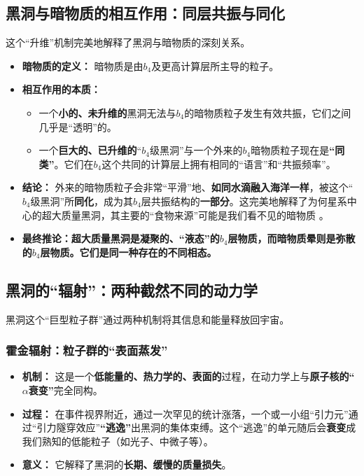 \documentclass[11pt, a4paper]{article}
\begin{document}
\subsection{黑洞与暗物质的相互作用：同层共振与同化}

这个“升维”机制完美地解释了黑洞与暗物质的深刻关系。

\begin{itemize}
    \item \textbf{暗物质的定义：} 暗物质是由$b_4$及更高计算层所主导的粒子。
    \item \textbf{相互作用的本质：}
    \begin{itemize}
        \item 一个\textbf{小的、未升维的}黑洞无法与$b_4$的暗物质粒子发生有效共振，它们之间几乎是“透明”的。
        \item 一个\textbf{巨大的、已升维的}“$b_4$级黑洞”与一个外来的$b_4$暗物质粒子现在是\textbf{“同类”}。它们在$b_4$这个共同的计算层上拥有相同的“语言”和“共振频率”。
    \end{itemize}
    \item \textbf{结论：} 外来的暗物质粒子会非常“平滑”地、\textbf{如同水滴融入海洋一样}，被这个“$b_4$级黑洞”所\textbf{同化}，成为其$b_4$层共振结构的\textbf{一部分}。这完美地解释了为何星系中心的超大质量黑洞，其主要的“食物来源”可能是我们看不见的暗物质 \cite{Planck2020}。
    \item \textbf{最终推论：超大质量黑洞是凝聚的、“液态”的$b_4$层物质，而暗物质晕则是弥散的$b_4$层物质。它们是同一种存在的不同相态。}
\end{itemize}

\subsection{黑洞的“辐射”：两种截然不同的动力学}

黑洞这个“巨型粒子群”通过两种机制将其信息和能量释放回宇宙。

\subsubsection{霍金辐射：粒子群的“表面蒸发”}
\begin{itemize}
    \item \textbf{机制：} 这是一个\textbf{低能量的、热力学的、表面的}过程，在动力学上与\textbf{原子核的“$\alpha$衰变”}完全同构。
    \item \textbf{过程：} 在事件视界附近，通过一次罕见的统计涨落，一个或一小组“引力元”通过“引力隧穿效应”\textbf{“逃逸”}出黑洞的集体束缚。这个“逃逸”的单元随后会\textbf{衰变}成我们熟知的低能粒子（如光子、中微子等）。
    \item \textbf{意义：} 它解释了黑洞的\textbf{长期、缓慢的质量损失}。
\end{itemize}
\end{document}
